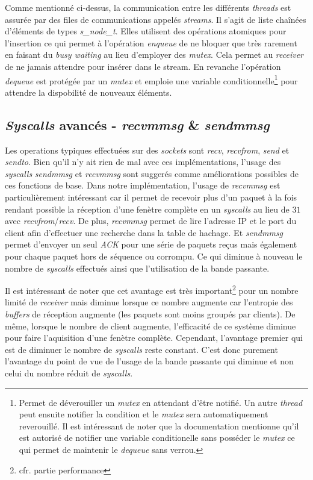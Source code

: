 \documentclass[../main.tex]{subfiles}
\begin{document}
Comme mentionné ci-dessus, la communication entre les différents \textit{threads} est assurée par des files de communications appelés \textit{streams}.
Il s'agit de liste chaînées d'éléments de types \textit{s\_node\_t}. Elles utilisent des opérations atomiques pour l'insertion ce qui permet
à l'opération \textit{enqueue} de ne bloquer que très rarement en faisant du \textit{busy waiting} au lieu d'employer des \textit{mutex}. Cela permet
au \textit{receiver} de ne jamais attendre pour insérer dans le stream. En revanche l'opération \textit{dequeue} est protégée par un \textit{mutex} et
emploie une variable conditionnelle\footnote{ Permet de déverouiller un \textit{mutex} en attendant d'être notifié. Un autre \textit{thread} peut ensuite notifier
la condition et le \textit{mutex} sera automatiquement reverouillé. Il est intéressant de noter que la documentation mentionne qu'il est autorisé
de notifier une variable conditionelle sans posséder le \textit{mutex} ce qui permet de maintenir le \textit{dequeue} sans verrou. } pour attendre la dispobilité de nouveaux éléments.

\subsection{\textit{Syscalls} avancés - \textit{recvmmsg} \& \textit{sendmmsg}}
\label{sec:syscalls}

Les operations typiques effectuées sur des \textit{sockets} sont \textit{recv}, \textit{recvfrom}, \textit{send} et \textit{sendto}. Bien qu'il n'y ait rien
de mal avec ces implémentations, l'usage des \textit{syscalls} \textit{sendmmsg} et \textit{recvmmsg} sont suggerés comme améliorations possibles\cite{that_awesome_paper}
de ces fonctions de base. Dans notre implémentation, l'usage de \textit{recvmmsg} est particulièrement intéressant car il permet de recevoir plus d'un paquet à la fois
rendant possible la réception d'une fenètre complète en un \textit{syscalls} au lieu de $31$ avec \textit{recvfrom}/\textit{recv}. De plus, \textit{recvmmsg} permet
de lire l'adresse IP et le port du client afin d'effectuer une recherche dans la table de hachage. Et \textit{sendmmsg} permet d'envoyer un seul \textit{ACK} pour
une série de paquets reçus mais également pour chaque paquet hors de séquence ou corrompu. Ce qui diminue à nouveau le nombre de \textit{syscalls} effectués ainsi que 
l'utilisation de la bande passante.

Il est intéressant de noter que cet avantage est très important\footnote{ cfr. partie performance} pour un nombre limité de \textit{receiver} mais diminue lorsque  
ce nombre augmente car l'entropie des \textit{buffers} de réception augmente (les paquets sont moins groupés par clients). De même, lorsque le nombre de client augmente, 
l'efficacité de ce système diminue pour faire l'aquisition d'une fenètre complète. Cependant, l'avantage premier qui est de diminuer le nombre de \textit{syscalls} 
reste constant. C'est donc purement l'avantage du point de vue de l'usage de la bande passante qui diminue et non celui du nombre réduit de \textit{syscalls}. 
\end{document}
